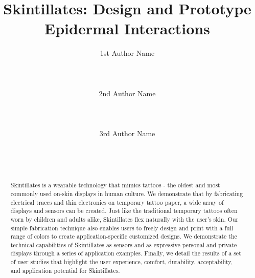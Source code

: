 \documentclass{sigchi}
\begin{document}
\title{Skintillates: Design and Prototype Epidermal Interactions}

\author{
  \alignauthor 1st Author Name\\
    \\
    \\
    \\
  \alignauthor 2nd Author Name\\
    \\
    \\
    \\
  \alignauthor 3rd Author Name\\
    \\
    \\
    \\
}

\maketitle

\begin{abstract}
Skintillates is a wearable technology that mimics tattoos - the oldest and most commonly used on-skin displays in human culture. We demonstrate that by fabricating electrical traces and thin electronics on temporary tattoo paper, a wide array of displays and sensors can be created. Just like the traditional temporary tattoos often worn by children and adults alike, Skintillates flex naturally with the user’s skin. Our simple fabrication technique also enables users to freely design and print with a full range of colors to create application-specific customized designs. We demonstrate the technical capabilities of Skintillates as sensors and as expressive personal and private displays through a series of application examples. Finally, we detail the results of a set of user studies that highlight the user experience, comfort, durability, acceptability, and application potential for Skintillates. 
\end{abstract}


\end{document}
